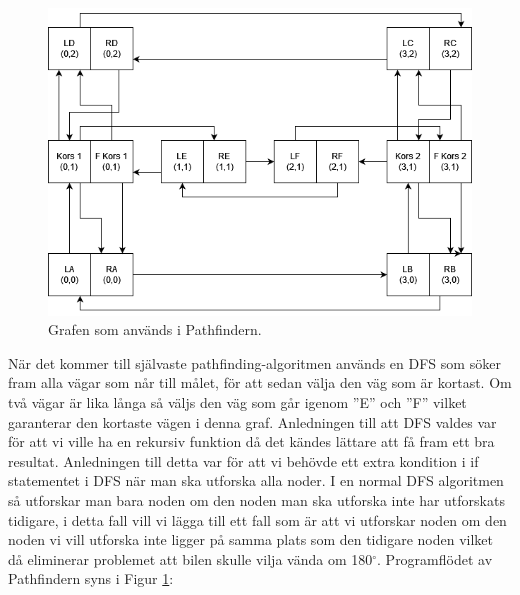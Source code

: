 \documentclass[10pt,oneside,swedish]{lips}
\begin{document}
\begin{figure}[H]
  \centering
  \includegraphics[width=1\textwidth]{./Figures/Grafen_noderna.png}
  \caption{Grafen som används i Pathfindern.}
  \label{fig:Grafen_noderna.png}
\end{figure}

\noindent
När det kommer till självaste pathfinding-algoritmen används en DFS som söker fram alla vägar som når till målet, för att sedan välja den väg som är kortast. Om två vägar är lika långa så väljs den väg som går igenom ''E'' och ''F'' vilket garanterar den kortaste vägen i denna graf. Anledningen till att DFS valdes var för att vi ville ha en rekursiv funktion då det kändes lättare att få fram ett bra resultat. Anledningen till detta var för att vi behövde ett extra kondition i if statementet i DFS när man ska utforska alla noder. I en normal DFS algoritmen så utforskar man bara noden om den noden man ska utforska inte har utforskats tidigare, i detta fall vill vi lägga till ett fall som är att vi utforskar noden om den noden vi vill utforska inte ligger på samma plats som den tidigare noden vilket då eliminerar problemet att bilen skulle vilja vända om 180$^{\circ}$. Programflödet av Pathfindern syns i Figur \ref{fig:Grafen_noderna.png}:
\end{document}
